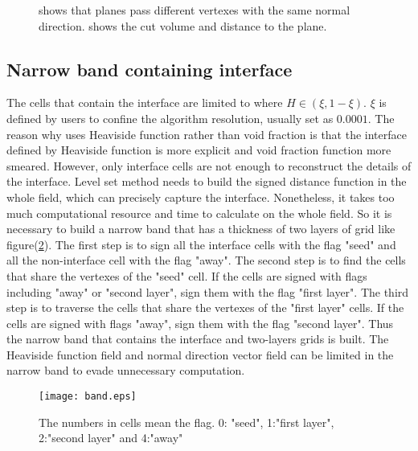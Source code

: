 \begin{figure}[htbp]
\centering
{}
\quad
{}
\caption{ shows that planes pass different vertexes with the same normal direction.  shows the cut volume and distance to the plane.}
\label{fig:multi}
\end{figure}

\subsection{Narrow band containing interface}
The cells that contain the interface are limited to where $H\in(\xi,1-\xi)$. $\xi$ is defined by users to confine the algorithm resolution, usually set as $0.0001$. The reason why uses Heaviside function rather than void fraction is that the interface defined by Heaviside function is more explicit and void fraction function more smeared. However, only interface cells are not enough to reconstruct the details of the interface. Level set method needs to build the signed distance function in the whole field, which can precisely capture the interface. Nonetheless, it takes too much computational resource and time to calculate on the whole field. So it is necessary to build a narrow band that has a thickness of two layers of grid like figure(\ref{fig:NarrowBand}). The first step is to sign all the interface cells with the flag "seed" and all the non-interface cell with the flag "away". The second step is to find the cells that share the vertexes of the "seed" cell. If the cells are signed with flags including "away" or "second layer", sign them with the flag "first layer". The third step is to traverse the cells that share the vertexes of the "first layer" cells. If the cells are signed with flags "away", sign them with the flag "second layer". Thus the narrow band that contains the interface and two-layers grids is built. The Heaviside function field and normal direction vector field can be limited in the narrow band to evade unnecessary computation.
\begin{figure}[htbp]
\centering
\texttt{[image: band.eps]}
\caption{The numbers in cells mean the flag. 0: "seed", 1:"first layer", 2:"second layer" and 4:"away"}
\label{fig:NarrowBand}
\end{figure}

